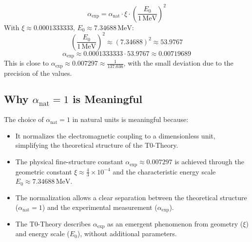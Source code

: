 \documentclass[12pt,a4paper]{article}
\theoremstyle{definition}
\begin{document}
\[
\alpha_{\text{exp}} = \alpha_{\text{nat}} \cdot \xi \cdot \left(\frac{E_0}{1 \, \text{MeV}}\right)^2
\]
With $\xi \approx 0.0001333333$, $E_0 \approx 7.34688 \, \text{MeV}$:
\[
\left(\frac{E_0}{1 \, \text{MeV}}\right)^2 \approx (7.34688)^2 \approx 53.9767
\]
\[
\alpha_{\text{exp}} \approx 0.0001333333 \cdot 53.9767 \approx 0.00719689
\]
This is close to $\alpha_{\text{exp}} \approx 0.007297 \approx \frac{1}{137.036}$, with the small deviation due to the precision of the values.

\subsection*{Why $\alpha_{\text{nat}} = 1$ is Meaningful}

The choice of $\alpha_{\text{nat}} = 1$ in natural units is meaningful because:
\begin{itemize}
	\item It normalizes the electromagnetic coupling to a dimensionless unit, simplifying the theoretical structure of the T0-Theory.
	\item The physical fine-structure constant $\alpha_{\text{exp}} \approx 0.007297$ is achieved through the geometric constant $\xi \approx \frac{4}{3} \times 10^{-4}$ and the characteristic energy scale $E_0 \approx 7.34688 \, \text{MeV}$.
	\item The normalization allows a clear separation between the theoretical structure ($\alpha_{\text{nat}} = 1$) and the experimental measurement ($\alpha_{\text{exp}}$).
	\item The T0-Theory describes $\alpha_{\text{exp}}$ as an emergent phenomenon from geometry ($\xi$) and energy scale ($E_0$), without additional parameters.
\end{itemize}
	
\end{document}

